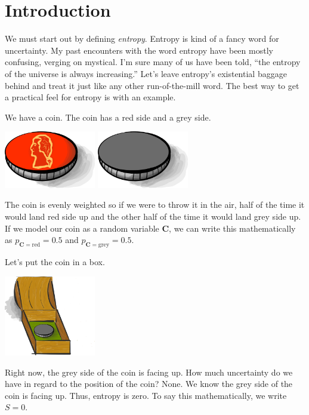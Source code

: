 \section{Introduction}

We must start out by defining \textit{entropy}.
Entropy is kind of a fancy word for uncertainty.
My past encounters with the word entropy have been mostly confusing, verging on mystical.
I'm sure many of us have been told, ``the entropy of the universe is always increasing.''
Let's leave entropy's existential baggage behind and treat it just like any other run-of-the-mill word.
The best way to get a practical feel for entropy is with an example.

We have a coin.
The coin has a red side and a grey side.
\begin{center}
\includegraphics[width=0.3\textwidth]{img/red-coin}
\includegraphics[width=0.3\textwidth]{img/grey-coin}
\end{center}
The coin is evenly weighted so if we were to throw it in the air, half of the time it would land red side up and the other half of the time it would land grey side up.
If we model our coin as a random variable $\bm{C}$, we can write this mathematically as $p_{\bm{C} = \text{red}} = 0.5$ and $p_{\bm{C} = \text{grey}} = 0.5$.

Let's put the coin in a box.
\begin{center}
\includegraphics[width=0.3\textwidth]{img/big-box-open-coin}
\end{center}
Right now, the grey side of the coin is facing up.
How much uncertainty do we have in regard to the position of the coin?
None.
We know the grey side of the coin is facing up.
Thus, entropy is zero.
To say this mathematically, we write $S = 0$.

